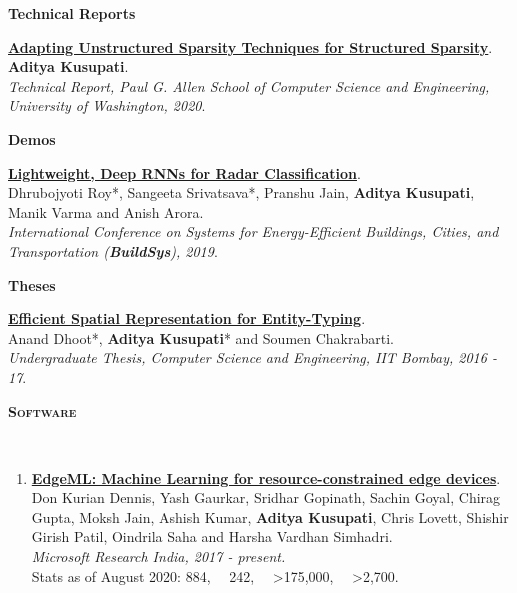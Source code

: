 \documentclass[10pt]{article}
\renewcommand{\section}[1]{
\bigskip
  \begin{Large}
  {\textsc{\textbf{#1}}}
  \end{Large}
  \hrulefill
  \medskip
  \\
}
\newcommand{\homepage}{https://homes.cs.washington.edu/~kusupati}
\begin{document}
\textbf{\large{Technical Reports}}
\begin{etaremune}[]
\item \href{\homepage/pubs/kusupati20a.pdf}{\textbf{Adapting Unstructured Sparsity Techniques for Structured Sparsity}}.\\
\textbf{Aditya Kusupati}.\\
\emph{Technical Report, Paul G. Allen School of Computer Science and Engineering, University of Washington, 2020}.
\end{etaremune}
\clearpage
\textbf{\large{Demos}}
\begin{etaremune}[]
\item \href{\homepage/pubs/roy19-demo.pdf}{\textbf{Lightweight, Deep RNNs for Radar Classification}}.\\
Dhrubojyoti Roy*, Sangeeta Srivatsava*, Pranshu Jain, \textbf{Aditya Kusupati}, Manik Varma and Anish Arora.\\
\emph{International Conference on Systems for Energy-Efficient Buildings, Cities, and Transportation (\textbf{BuildSys}), 2019}.
\end{etaremune}

\textbf{\large{Theses}}
\begin{etaremune}
\item \href{\homepage/pubs/kusupati17.pdf}{\textbf{Efficient Spatial Representation for Entity-Typing}}.\\
Anand Dhoot*, \textbf{Aditya Kusupati}* and Soumen Chakrabarti.\\
\textit{Undergraduate Thesis, Computer Science and Engineering, IIT Bombay, 2016 - 17}.
\end{etaremune}

\section{Software}
\label{sec:soft}
\vspace{-5mm}
\begin{enumerate}
    \item \href{https://github.com/microsoft/EdgeML}{\textbf{EdgeML: Machine Learning for resource-constrained edge devices}}.\\
    Don Kurian Dennis, Yash Gaurkar, Sridhar Gopinath, Sachin Goyal, Chirag Gupta, Moksh Jain, Ashish Kumar, \textbf{Aditya Kusupati}, Chris Lovett, Shishir Girish Patil, Oindrila Saha and Harsha Vardhan Simhadri.\\
    \textit{Microsoft Research India, 2017 - present.}\\
     Stats as of August 2020:  884, ~\faCodeFork ~242, ~\faEye ~\textgreater175,000, ~\faClone ~\textgreater2,700.
\end{enumerate}
\end{document}

